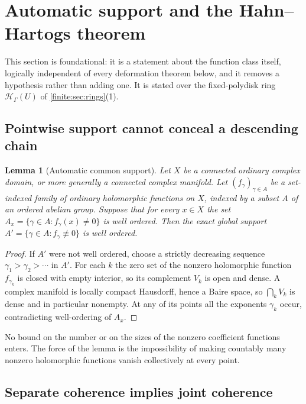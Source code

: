 \documentclass[11pt,letterpaper]{article}
\newtheorem{lemma}[theorem]{Lemma}
\theoremstyle{definition}
\theoremstyle{remark}
\newcommand{\HH}{\mathscr H}
\numberwithin{equation}{section}
\begin{document}
\section{Automatic support and the Hahn--Hartogs theorem}
\label{finite:sec:hartogs}

This section is foundational: it is a statement about the function class itself, logically independent of every deformation theorem below, and it removes a hypothesis rather than adding one. It is stated over the fixed-polydisk ring $\HH_\Gamma(U)$ of \cref{finite:sec:rings}(1).

\subsection{Pointwise support cannot conceal a descending chain}
\label{finite:sec:autosupport}

\begin{lemma}[Automatic common support]
\label{finite:lem:autosupport}
Let $X$ be a connected ordinary complex domain, or more generally a connected complex manifold. Let $(f_\gamma)_{\gamma\in A}$ be a set-indexed family of ordinary holomorphic functions on $X$, indexed by a subset $A$ of an ordered abelian group. Suppose that for every $x\in X$ the set $A_x=\{\gamma\in A:f_\gamma(x)\neq0\}$ is well ordered. Then the exact global support $A'=\{\gamma\in A:f_\gamma\not\equiv0\}$ is well ordered.
\end{lemma}

\begin{proof}
If $A'$ were not well ordered, choose a strictly decreasing sequence $\gamma_1>\gamma_2>\cdots$ in $A'$. For each $k$ the zero set of the nonzero holomorphic function $f_{\gamma_k}$ is closed with empty interior, so its complement $V_k$ is open and dense. A complex manifold is locally compact Hausdorff, hence a Baire space, so $\bigcap_kV_k$ is dense and in particular nonempty. At any of its points all the exponents $\gamma_k$ occur, contradicting well-ordering of $A_x$.
\end{proof}

No bound on the number or on the sizes of the nonzero coefficient functions enters. The force of the lemma is the impossibility of making countably many nonzero holomorphic functions vanish collectively at every point.

\subsection{Separate coherence implies joint coherence}
\label{finite:sec:separate}
\end{document}
